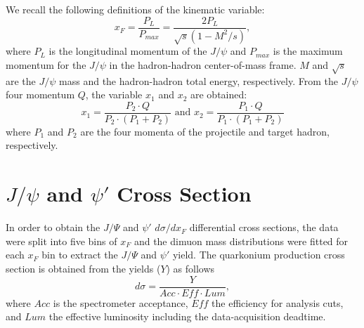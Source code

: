 \documentclass[reprint,aps,unsortedaddress,superscriptaddress,prd,floatfix,showpacs,linenumbers]{revtex4-2}
\begin{document}
We recall the following definitions of the kinematic variable:
\begin{equation}
	x_F = \frac{P_L}{P_{max}}=\frac{2P_L}{\sqrt{s}\left(1-M^2/s\right)},
\end{equation}
where $P_L$ is the longitudinal momentum of the $J/\psi$ and $P_{max}$ is
the maximum momentum for the $J/\psi$ in the hadron-hadron center-of-mass
frame. $M$ and $\sqrt{s}$ are the $J/\psi$ mass and the hadron-hadron total energy,
respectively. From the $J/\psi$ four momentum $Q$, the variable $x_1$ and $x_2$
are obtained:
\begin{equation}
	x_1=\frac{P_2\cdot Q}{P_2 \cdot \left(P_1 + P_2\right)} \textrm{ and } x_2=\frac{P_1\cdot Q}{P_1 \cdot \left(P_1 + P_2\right)} 
\end{equation}
where $P_1$ and $P_2$ are the four momenta of the projectile and target hadron,
respectively.

\section{\texorpdfstring{$J/\psi$}{J/psi} and \texorpdfstring{$\psi'$}{psi'} Cross Section}
\label{sec:cross_section}
In order to obtain the $J/\Psi$ and $\psi'$ $d\sigma/dx_F$ differential cross sections,
the data were split into five bins of $x_F$ and the dimuon mass distributions
were fitted for each $x_F$ bin to extract the $J/\Psi$ and $\psi'$ yield.
The quarkonium production cross section is obtained from the yields ($Y$) as follows
\begin{equation}
d\sigma = \frac{Y}{Acc \cdot Eff \cdot Lum}, 
\label{eq:eq2}
\end{equation}    
where $Acc$ is the spectrometer acceptance, $Eff$ the efficiency for 
analysis cuts, and $Lum$ the effective luminosity including the 
data-acquisition deadtime. 
\end{document}
